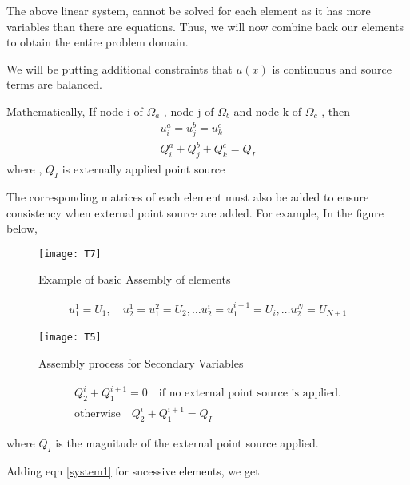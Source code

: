 The above linear system, cannot be solved for each element as it has more variables than there are equations. Thus, we will now combine back our elements to obtain the entire problem domain.

We will be putting additional constraints that $u(x)$ is continuous and source terms are balanced.

Mathematically, If node i of $\Omega_a$ , node j of $\Omega_b$ and  node k of $\Omega_c$ , then 
\begin{eqnarray}
	u_i^a = u_j^b = u_k^c\\
	Q_i^a + Q_j^b + Q_k^c = Q_I
\end{eqnarray}
where , $Q_I$ is externally applied point source

The corresponding matrices of each element must also be added to ensure consistency when external point source are added.
For example,
In the figure below,
    \begin{figure}[h!]
	\centering
	\texttt{[image: T7]}
	\caption{Example of basic Assembly of elements}
\end{figure}
\begin{eqnarray}
	u_1^1 = U_1 , \quad	u_2^1 = u_1^2 =  U_2,  \dots 	u_2^i = u_1^{i+1} =  U_i , \dots u_2^N = U_{N+1}
\end{eqnarray}
    \begin{figure}[h!]
	\centering
	\texttt{[image: T5]}
	\caption{Assembly process for Secondary Variables}
\end{figure}
\begin{eqnarray}
	Q_2^i + Q_1^{i+1} = 0 \quad \text{if no external point source is applied.}\\ \text{otherwise} \quad
	Q_2^i + Q_1^{i+1} = Q_I 
\end{eqnarray}

where $Q_I$ is the magnitude of the external point source applied.

Adding eqn \ref{system1} for sucessive elements, we get



